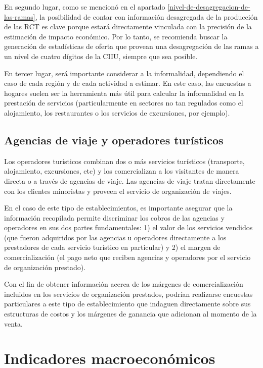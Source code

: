\documentclass[
  openany]{book}
\begin{document}
En segundo lugar, como se mencionó en el apartado \ref{nivel-de-desagregacion-de-las-ramas}, la posibilidad de contar con información desagregada de la producción de las RCT es clave porque estará directamente vinculada con la precisión de la estimación de impacto económico. Por lo tanto, se recomienda buscar la generación de estadísticas de oferta que provean una desagregación de las ramas a un nivel de cuatro dígitos de la CIIU, siempre que sea posible.

En tercer lugar, será importante considerar a la informalidad, dependiendo el caso de cada región y de cada actividad a estimar. En este caso, las encuestas a hogares suelen ser la herramienta más útil para calcular la informalidad en la prestación de servicios (particularmente en sectores no tan regulados como el alojamiento, los restaurantes o los servicios de excursiones, por ejemplo).

\hypertarget{agencias-de-viaje-y-operadores-turisticos}{%
\subsection{Agencias de viaje y operadores turísticos}\label{agencias-de-viaje-y-operadores-turisticos}}

Los operadores turísticos combinan dos o más servicios turísticos (transporte, alojamiento, excursiones, etc) y los comercializan a los visitantes de manera directa o a través de agencias de viaje. Las agencias de viaje tratan directamente con los clientes minoristas y proveen el servicio de organización de viajes.

En el caso de este tipo de establecimientos, es importante asegurar que la información recopilada permite discriminar los cobros de las agencias y operadores en sus dos partes fundamentales: 1) el valor de los servicios vendidos (que fueron adquiridos por las agencias u operadores directamente a los prestadores de cada servicio turístico en particular) y 2) el margen de comercialización (el pago neto que reciben agencias y operadores por el servicio de organización prestado).

Con el fin de obtener información acerca de los márgenes de comercialización incluidos en los servicios de organización prestados, podrían realizarse encuestas particulares a este tipo de establecimiento que indaguen directamente sobre sus estructuras de costos y los márgenes de ganancia que adicionan al momento de la venta.

\hypertarget{indicadores-macroeconuxf3micos}{%
\section{Indicadores macroeconómicos}\label{indicadores-macroeconuxf3micos}}
\end{document}
